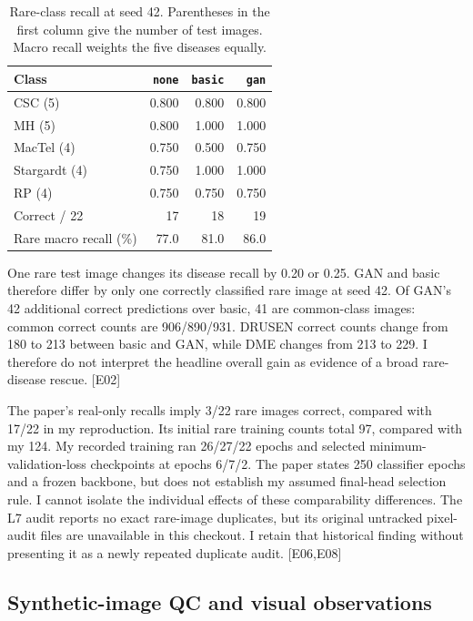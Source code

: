 \documentclass[11pt,a4paper]{article}
\newcommand{\ev}[1]{\textcolor{Link}{\textsf{[#1]}}}
\newcommand{\BasicCommon}{890}
\newcommand{\BasicRare}{18}
\newcommand{\BasicRareMacro}{81.0}
\newcommand{\GanCommon}{931}
\newcommand{\GanRare}{19}
\newcommand{\GanRareMacro}{86.0}
\newcommand{\NoneCommon}{906}
\newcommand{\NoneRare}{17}
\newcommand{\NoneRareMacro}{77.0}
\begin{document}
\begin{table}[htbp]
\centering\small
\caption{Rare-class recall at seed 42. Parentheses in the first column give
the number of test images. Macro recall weights the five diseases equally.}
\label{tab:rare}
\begin{tabular}{lrrr}
\toprule
Class & \texttt{none} & \texttt{basic} & \texttt{gan}\\
\midrule
CSC (5) & 0.800 & 0.800 & 0.800\\
MH (5) & 0.800 & 1.000 & 1.000\\
MacTel (4) & 0.750 & 0.500 & 0.750\\
Stargardt (4) & 0.750 & 1.000 & 1.000\\
RP (4) & 0.750 & 0.750 & 0.750\\
\midrule
Correct / 22 & \NoneRare & \BasicRare & \GanRare\\
Rare macro recall (\%) & \NoneRareMacro & \BasicRareMacro & \GanRareMacro\\
\bottomrule
\end{tabular}
\end{table}

One rare test image changes its disease recall by 0.20 or 0.25. GAN and basic
therefore differ by only one correctly classified rare image at seed 42.
Of GAN's 42 additional correct predictions over basic, 41 are common-class
images: common correct counts are \NoneCommon/\BasicCommon/\GanCommon.
DRUSEN correct counts change from 180 to 213 between basic and GAN, while
DME changes from 213 to 229. I therefore do not interpret the headline
overall gain as evidence of a broad rare-disease rescue. \ev{E02}

The paper's real-only recalls imply 3/22 rare images correct, compared with
17/22 in my reproduction. Its initial rare training counts total 97, compared
with my 124. My recorded training ran 26/27/22 epochs and selected minimum-validation-loss
checkpoints at epochs 6/7/2. The paper states 250 classifier epochs and a frozen
backbone, but does not establish my assumed final-head selection rule.
I cannot isolate the individual effects of these comparability differences.
The L7 audit reports no exact rare-image duplicates, but its original untracked
pixel-audit files are unavailable in this checkout. I retain that historical
finding without presenting it as a newly repeated duplicate audit.
\ev{E06,E08}\cite{yoo2021}

\subsection{Synthetic-image QC and visual observations}
\end{document}
